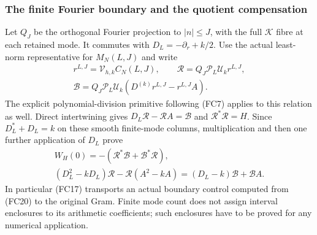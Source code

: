 \subsubsection{The finite Fourier boundary and the quotient compensation}

Let $Q_J$ be the orthogonal Fourier projection to $|n|\le J$, with
the full $\mathcal K$ fibre at each retained mode. It commutes with
$D_L=-\partial_r+k/2$. Use the actual least-norm representative for
$M_N(L,J)$ and write
\[
\begin{gathered}
 r^{L,J}=\mathcal V_{h,k}C_N(L,J),\qquad
 \mathscr R=Q_J\mathcal P_L\mathcal U_kr^{L,J},\\
 \mathscr B=Q_J\mathcal P_L\mathcal U_k
                (D^{(k)}r^{L,J}-r^{L,J}A).
\end{gathered}\tag{FC19}
\]
The explicit polynomial-division primitive following (FC7) applies
to this relation as well. Direct intertwining gives
$D_L\mathscr R-\mathscr RA=\mathscr B$ and $\mathscr R^*\mathscr R=H$.
Since $D_L^*+D_L=k$ on these smooth finite-mode columns, multiplication
and then one further application of $D_L$ prove
\[
\begin{gathered}
 W_H(0)=-(\mathscr R^*\mathscr B+\mathscr B^*\mathscr R),\\
 (D_L^2-kD_L)\mathscr R-\mathscr R(A^2-kA)
                    =(D_L-k)\mathscr B+\mathscr BA.
\end{gathered}\tag{FC20}
\]
In particular (FC17) transports an actual boundary control computed
from (FC20) to the original Gram. Finite mode count does not assign
interval enclosures to its arithmetic coefficients; such enclosures
have to be proved for any numerical application.

